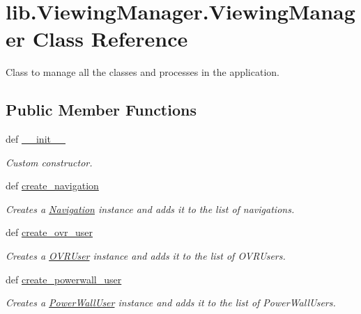 \hypertarget{classlib_1_1ViewingManager_1_1ViewingManager}{\section{lib.\-Viewing\-Manager.\-Viewing\-Manager \-Class \-Reference}
\label{classlib_1_1ViewingManager_1_1ViewingManager}
}


\-Class to manage all the classes and processes in the application.  


\subsection*{\-Public \-Member \-Functions}
\begin{DoxyCompactItemize}
\item 
def \hyperlink{classlib_1_1ViewingManager_1_1ViewingManager_af1ddb763f6ec01e4254b93a50254be81}{\-\_\-\-\_\-init\-\_\-\-\_\-}
\begin{DoxyCompactList}\small\item\em \-Custom constructor. \end{DoxyCompactList}\item 
def \hyperlink{classlib_1_1ViewingManager_1_1ViewingManager_a7ab2628243f8a8890b1ac734a93732de}{create\-\_\-navigation}
\begin{DoxyCompactList}\small\item\em \-Creates a \hyperlink{namespacelib_1_1Navigation}{\-Navigation} instance and adds it to the list of navigations. \end{DoxyCompactList}\item 
def \hyperlink{classlib_1_1ViewingManager_1_1ViewingManager_aa87d324bcf1c883ab07eaedfd942a841}{create\-\_\-ovr\-\_\-user}
\begin{DoxyCompactList}\small\item\em \-Creates a \hyperlink{namespacelib_1_1OVRUser}{\-O\-V\-R\-User} instance and adds it to the list of \-O\-V\-R\-Users. \end{DoxyCompactList}\item 
def \hyperlink{classlib_1_1ViewingManager_1_1ViewingManager_a31f3abfb47ec5976734411443b02d3fc}{create\-\_\-powerwall\-\_\-user}
\begin{DoxyCompactList}\small\item\em \-Creates a \hyperlink{namespacelib_1_1PowerWallUser}{\-Power\-Wall\-User} instance and adds it to the list of \-Power\-Wall\-Users. \end{DoxyCompactList}\item 

\end{DoxyCompactItemize}

